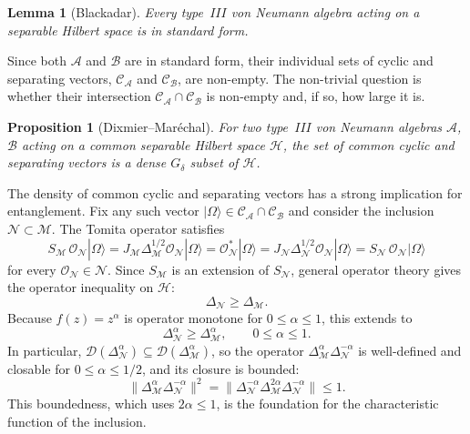 \documentclass[a4paper,11pt]{article}
\newtheorem{lemma}[theorem]{Lemma}
\newtheorem{proposition}[theorem]{Proposition}
\theoremstyle{definition}
\begin{document}
\begin{lemma}[Blackadar]\label{lem:typeIII-standard}
Every type~$III$ von Neumann algebra acting on a separable Hilbert space is in
standard form.
\end{lemma}

\noindent Since both $\mathcal{A}$ and $\mathcal{B}$ are in standard form, their individual
sets of cyclic and separating vectors, $\mathcal{C}_\mathcal{A}$ and $\mathcal{C}_\mathcal{B}$,
are non-empty.  The non-trivial question is whether their intersection
$\mathcal{C}_\mathcal{A}\cap\mathcal{C}_\mathcal{B}$ is non-empty and, if so, how large it is.

\begin{proposition}[Dixmier--Mar\'echal]\label{prop:dense-common}
For two type~$III$ von Neumann algebras $\mathcal{A}$, $\mathcal{B}$ acting on a common
separable Hilbert space $\mathcal{H}$, the set of common cyclic and separating vectors
is a dense $G_\delta$ subset of $\mathcal{H}$.
\end{proposition}

\noindent The density of common cyclic and separating vectors has a strong implication for
entanglement.  Fix any such vector $|\Omega\rangle\in\mathcal{C}_\mathcal{A}\cap\mathcal{C}_\mathcal{B}$
and consider the inclusion $\mathcal{N}\subset\mathcal{M}$.  The Tomita operator satisfies
\begin{equation}
  S_\mathcal{M}\,\mathcal{O}_\mathcal{N}|\Omega\rangle
  = J_\mathcal{M}\Delta_\mathcal{M}^{1/2}\mathcal{O}_\mathcal{N}|\Omega\rangle
  = \mathcal{O}_\mathcal{N}^*|\Omega\rangle
  = J_\mathcal{N}\Delta_\mathcal{N}^{1/2}\mathcal{O}_\mathcal{N}|\Omega\rangle
  = S_\mathcal{N}\,\mathcal{O}_\mathcal{N}|\Omega\rangle
  \label{eq:Tomita-extension}
\end{equation}
for every $\mathcal{O}_\mathcal{N}\in\mathcal{N}$.  Since $S_\mathcal{M}$ is an extension
of $S_\mathcal{N}$, general operator theory gives the operator inequality on
$\mathcal{H}$:
\begin{equation}
  \Delta_\mathcal{N} \geq \Delta_\mathcal{M}.
  \label{eq:modular-inequality}
\end{equation}
Because $f(z)=z^\alpha$ is operator monotone for $0\leq\alpha\leq 1$, this extends to
\begin{equation}
  \Delta_\mathcal{N}^\alpha \geq \Delta_\mathcal{M}^\alpha, \qquad 0\leq\alpha\leq 1.
  \label{eq:modular-inequality-alpha}
\end{equation}
In particular, $\mathcal{D}(\Delta_\mathcal{N}^\alpha)\subseteq\mathcal{D}(\Delta_\mathcal{M}^\alpha)$,
so the operator $\Delta_\mathcal{M}^\alpha\Delta_\mathcal{N}^{-\alpha}$ is well-defined
and closable for $0\leq\alpha\leq 1/2$, and its closure is bounded:
\begin{equation}
  \|\Delta_\mathcal{M}^\alpha\Delta_\mathcal{N}^{-\alpha}\|^2
  = \|\Delta_\mathcal{N}^{-\alpha}\Delta_\mathcal{M}^{2\alpha}\Delta_\mathcal{N}^{-\alpha}\|
  \leq 1.
  \label{eq:characteristic-bounded}
\end{equation}
This boundedness, which uses $2\alpha\leq 1$, is the foundation for the characteristic
function of the inclusion.
\end{document}
